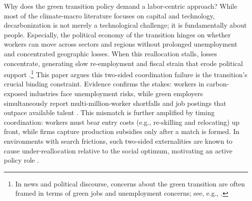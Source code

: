 \documentclass[preprint,12pt]{elsarticle}
\begin{document}
Why does the green transition policy demand a labor-centric approach? While most of the climate-macro literature focuses on capital and technology, decarbonization is not merely a technological challenge; it is fundamentally about people. Especially, the political economy of the transition hinges on whether workers can move across sectors and regions without prolonged unemployment and concentrated geographic losses. When this reallocation stalls, losses concentrate, generating slow re-employment and fiscal strain that erode political support \citep{walker2011environmental,walker2013transitional,conte2022,curtis2018restat,gray2014jeem,douenne2022aer,klenert2018ncc}.\footnote{In news and political discourse, concerns about the green transition are often framed in terms of green jobs and unemployment concerns; see, e.g., \citep{NYTLeftBehind2023,BBCNetZero2024}.} This paper argues this two-sided coordination failure is the transition's crucial binding constraint. Evidence confirms the stakes: workers in carbon-exposed industries face unemployment risks, while green employers simultaneously report multi-million-worker shortfalls and job postings that outpace available talent \citep{bluedorn2022greener,linkedin2024greenskills,ilo2019skills,bcg2023greengap,iea2023wee}. This mismatch is further amplified by timing coordination: workers must bear entry costs (e.g., re-skilling and relocating) up front, while firms capture production subsidies only after a match is formed. In environments with search frictions, such two-sided externalities are known to cause under-reallocation relative to the social optimum, motivating an active policy role \citep{diamond1982, cooper1988, mortensen1994, pissarides2000}. 
\end{document}
